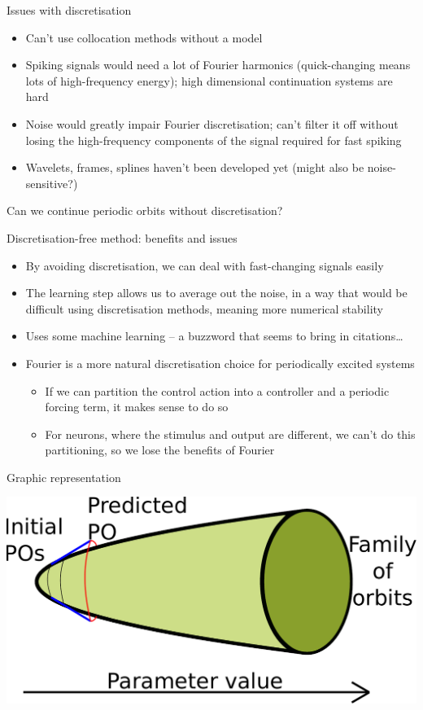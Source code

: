 \documentclass[presentation]{beamer}
\begin{document}
\begin{frame}[label={sec:org3a5838c}]{Issues with discretisation}
\begin{itemize}
\item Can't use collocation methods without a model
\item Spiking signals would need a lot of Fourier harmonics (quick-changing means lots of high-frequency energy); high dimensional continuation systems are hard
\item Noise would greatly impair Fourier discretisation; can't filter it off without losing the high-frequency components of the signal required for fast spiking
\item Wavelets, frames, splines haven't been developed yet (might also be noise-sensitive?)
\end{itemize}

Can we continue periodic orbits without discretisation?
\end{frame}

\begin{frame}[label={sec:orgd1565ea}]{Discretisation-free method: benefits and issues}
\begin{itemize}
\item By avoiding discretisation, we can deal with fast-changing signals easily
\item The learning step allows us to average out the noise, in a way that would be difficult using discretisation methods, meaning more numerical stability
\item Uses some machine learning -- a buzzword that seems to bring in citations\ldots{}
\item Fourier is a more natural discretisation choice for periodically excited systems
\begin{itemize}
\item If we can partition the control action into a controller and a periodic forcing term, it makes sense to do so
\item For neurons, where the stimulus and output are different, we can't do this partitioning, so we lose the benefits of Fourier
\end{itemize}
\end{itemize}
\end{frame}

\begin{frame}[label={sec:org510cf3b}]{Graphic representation}
\begin{center}
\includegraphics[width=.9\linewidth]{./po_family.pdf}
\end{center}
\end{frame}
\end{document}
